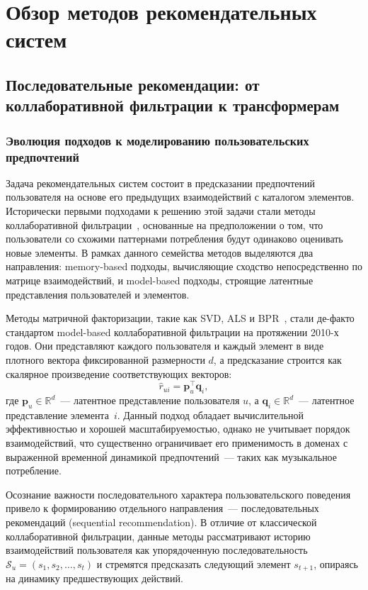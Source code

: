 \chapter{Обзор методов рекомендательных систем}

\section{Последовательные рекомендации: от коллаборативной фильтрации к трансформерам}

\subsection{Эволюция подходов к моделированию пользовательских предпочтений}

Задача рекомендательных систем состоит в предсказании предпочтений пользователя на основе его предыдущих взаимодействий с каталогом элементов. Исторически первыми подходами к решению этой задачи стали методы коллаборативной фильтрации~\cite{koren2009matrix}, основанные на предположении о том, что пользователи со схожими паттернами потребления будут одинаково оценивать новые элементы. В рамках данного семейства методов выделяются два направления: memory-based подходы, вычисляющие сходство непосредственно по матрице взаимодействий, и model-based подходы, строящие латентные представления пользователей и элементов.

Методы матричной факторизации, такие как SVD, ALS и BPR~\cite{rendle2009bpr}, стали де-факто стандартом model-based коллаборативной фильтрации на протяжении 2010-х годов. Они представляют каждого пользователя и каждый элемент в виде плотного вектора фиксированной размерности $d$, а предсказание строится как скалярное произведение соответствующих векторов:
\begin{equation}
    \hat{r}_{ui} = \mathbf{p}_u^\top \mathbf{q}_i,
\end{equation}
где $\mathbf{p}_u \in \mathbb{R}^d$~--- латентное представление пользователя $u$, а $\mathbf{q}_i \in \mathbb{R}^d$~--- латентное представление элемента~$i$. Данный подход обладает вычислительной эффективностью и хорошей масштабируемостью, однако не учитывает порядок взаимодействий, что существенно ограничивает его применимость в доменах с выраженной временно\'{й} динамикой предпочтений~--- таких как музыкальное потребление.

Осознание важности последовательного характера пользовательского поведения привело к формированию отдельного направления~--- последовательных рекомендаций (sequential recommendation). В отличие от классической коллаборативной фильтрации, данные методы рассматривают историю взаимодействий пользователя как упорядоченную последовательность $\mathcal{S}_u = (s_1, s_2, \ldots, s_t)$ и стремятся предсказать следующий элемент $s_{t+1}$, опираясь на динамику предшествующих действий.

